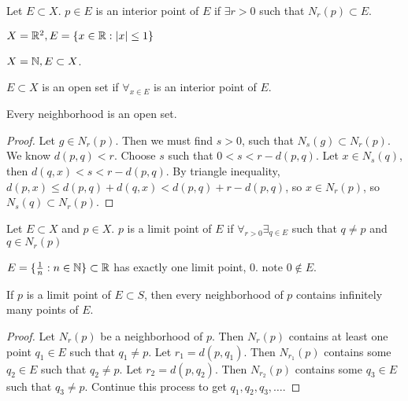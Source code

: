 \begin{definition}
	Let $E \subset X$. $p \in E$ is an interior point of $E$ if $\exists r>0$ such that $N_r(p) \subset E$.
\end{definition}
\begin{example}
	\item $X=\mathbb{R}^2, E=\{x \in \mathbb{R} : |x|\le 1\} $
	\item $X=\mathbb{N}, E \subset X$.
\end{example}

\begin{definition}
	$E \subset X$ is an open set if $\forall_{x\in E}$ is an interior point of $E$.

\end{definition}

\begin{theorem}
	Every neighborhood is an open set.
	\begin{proof}
		Let $g \in N_r(p)$. Then we must find $s>0$, such that $N_s(g) \subset N_r(p)$.
		We know $d(p,q)<r$. Choose $s$ such that $0<s<r-d(p,q)$.
		Let $x \in N_s(q)$, then $d(q,x) < s<r-d(p,q)$.
		By triangle inequality, $d(p,x) \le d(p,q)+d(q,x)<d(p,q)+r-d(p,q)$, so $x \in N_r(p)$, so $N_s(q) \subset N_r(p)$.
	\end{proof}
\end{theorem}

\begin{definition}
	Let $E \subset X$ and $p \in X$.
	$p$ is a limit point of $E$ if $\forall_{r>0} \exists_{q \in E}$ such that $q \neq p$ and $q \in N_r(p)$
\end{definition}
\begin{example}
	$E=\{\frac{1}{n}: n \in  \mathbb{N} \}\subset \mathbb{R}  $ has exactly one limit point, $0$. note $0 \not\in E$.
\end{example}

\begin{theorem}
	If $p$ is a limit point of $E \subset S$, then every neighborhood of $p$ contains infinitely many points of $E$.
	\begin{proof}
		Let $N_r(p)$ be a neighborhood of $p$. Then $N_r(p)$ contains at least one point $q_1 \in E$ such that $q_1 \neq p$.
		Let $r_1=d(p,q_1)$. Then $N_{r_1}(p)$ contains some $q_2 \in E$ such that $q_2 \neq p$.
		Let $r_2=d(p,q_2)$. Then $N_{r_2}(p)$ contains some $q_3 \in E$ such that $q_3 \neq p$.
		Continue this process to get $q_1,q_2,q_3,\ldots$.
	\end{proof}

\end{theorem}

